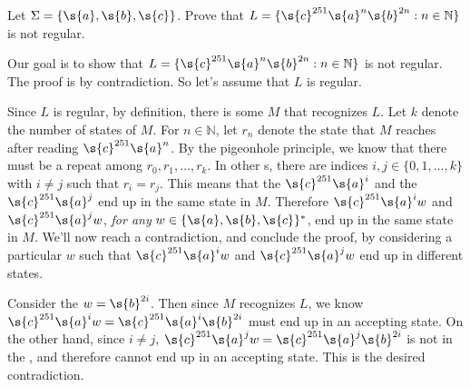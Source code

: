 \begin{flex}
\begin{exercise} \label{exercise:c251anb2n-is-not-regular}
Let $\Sigma = \{\s{a},\s{b},\s{c}\}$. Prove that $L = \{\s{c}^{251} \s{a}^n \s{b}^{2n}: n \in \mathbb{N}\}$ is not regular. 
\end{exercise}
\begin{solution}
Our goal is to show that $L = \{\s{c}^{251} \s{a}^n \s{b}^{2n}: n \in \mathbb{N}\}$ is not regular. The proof is by contradiction. So let's assume that $L$ is regular. 

Since $L$ is regular, by definition, there is some  $M$ that recognizes $L$. Let $k$ denote the number of states of $M$. For $n \in \mathbb{N}$, let $r_n$ denote the state that $M$ reaches after reading $\s{c}^{251}\s{a}^n$. By the pigeonhole principle, we know that there must be a repeat among $r_0, r_1,\ldots, r_k$. In other s, there are indices $i, j \in \{0,1,\ldots,k\}$ with $i \neq j$ such that $r_i = r_j$. This means that the  $\s{c}^{251}\s{a}^i$ and the  $\s{c}^{251}\s{a}^j$ end up in the same state in $M$. Therefore $\s{c}^{251}\s{a}^iw$ and $\s{c}^{251}\s{a}^jw$, \emph{for any}  $w \in \{\s{a},\s{b},\s{c}\}^*$, end up in the same state in $M$. We'll now reach a contradiction, and conclude the proof, by considering a particular $w$ such that $\s{c}^{251}\s{a}^iw$ and $\s{c}^{251}\s{a}^jw$ end up in different states. 

Consider the  $w = \s{b}^{2i}$. Then since $M$ recognizes $L$, we know $\s{c}^{251}\s{a}^iw = \s{c}^{251}\s{a}^i\s{b}^{2i}$ must end up in an accepting state. On the other hand, since $i \neq j$, $\s{c}^{251}\s{a}^jw = \s{c}^{251}\s{a}^j\s{b}^{2i}$ is not in the , and therefore cannot end up in an accepting state. This is the desired contradiction.
\end{solution}
\end{flex}







